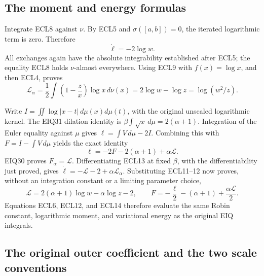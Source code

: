 \documentclass[11pt,a4paper]{article}
\begin{document}
\subsection{The moment and energy formulas}

Integrate ECL8 against $\nu$. By ECL5 and $\sigma([a,b])=0$,
the iterated logarithmic term is zero. Therefore
\begin{equation}\tag{ECL11}
\dot\ell=-2\log w.
\end{equation}
All exchanges again have the absolute integrability established
after ECL5; the equality ECL8 holds $\nu$-almost everywhere.
Using ECL9 with $f(x)=\log x$, and then ECL4, proves
\begin{equation}\tag{ECL12}
\boxed{\displaystyle
\mathcal L_\alpha
=\frac12\int\left(1-\frac z x\right)\log x\,d\nu(x)
=2\log w-\log z=\log(w^2/z).}
\end{equation}

Write $I=\iint\log|x-t|\,d\mu(x)d\mu(t)$, with the original
unscaled logarithmic kernel. The EIQ31 dilation identity is
$\beta\int\sqrt{x}\,d\mu=2(\alpha+1)$.
Integration of the Euler equality against $\mu$ gives
$\ell=\int V\,d\mu-2I$. Combining this with
$F=I-\int V\,d\mu$ yields the exact identity
\begin{equation}\tag{ECL13}
\ell=-2F-2(\alpha+1)+\alpha\mathcal L.
\end{equation}
EIQ30 proves $F_\alpha=\mathcal L$. Differentiating ECL13 at
fixed $\beta$, with the differentiability just proved, gives
$\dot\ell=-\mathcal L-2+\alpha\mathcal L_\alpha$.
Substituting ECL11--12 now proves, without an integration
constant or a limiting parameter choice,
\begin{equation}\tag{ECL14}
\boxed{\displaystyle
\mathcal L=2(\alpha+1)\log w-\alpha\log z-2,\qquad
F=-\frac{\ell}{2}-(\alpha+1)+\frac{\alpha\mathcal L}{2}.}
\end{equation}
Equations ECL6, ECL12, and ECL14 therefore evaluate the same
Robin constant, logarithmic moment, and variational energy as
the original EIQ integrals.

\subsection{The original outer coefficient and the two scale conventions}
\end{document}

